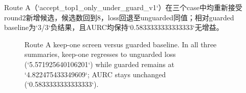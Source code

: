 \documentclass[UTF8]{ctexart}
\begin{document}
Route A（`accept_top1_only_under_guard_v1`）在三个case中均重新接受round2新增候选，候选数回到8，loss回退至unguarded同值；相对guarded baseline为`3/3`负结果，且AURC均保持`0.5833333333333333`无增益。

\begin{figure}[htbp]
\centering
{}
\caption{Route A keep-one screen versus guarded baseline. In all three summaries, keep-one regresses to unguarded loss (`5.571925640106201`) while guarded remains at `4.822475433349609`; AURC stays unchanged (`0.5833333333333333`).}
\label{fig:stage_d_appendix_route_a}
\end{figure}
\end{document}

